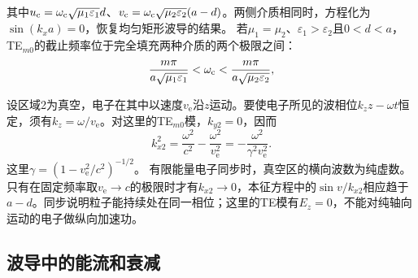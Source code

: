其中$u_\mathrm c = \omega_\mathrm c\sqrt{\mu_1\varepsilon_1}d$、$v_\mathrm c = \omega_\mathrm c\sqrt{\mu_2\varepsilon_2}(a - d)$。两侧介质相同时，方程化为$\sin(k_xa) = 0$，恢复均匀矩形波导的结果。
若$\mu_1 = \mu_2$、$\varepsilon_1 > \varepsilon_2$且$0 < d < a$，TE$_{m0}$的截止频率位于完全填充两种介质的两个极限之间：
\begin{equation}
    \label{eq:ed-dielectric-guide-cutoff-bounds}
    \frac{m\pi}{a\sqrt{\mu_1\varepsilon_1}} < \omega_\mathrm c < \frac{m\pi}{a\sqrt{\mu_2\varepsilon_2}},
\end{equation}

设区域2为真空，电子在其中以速度$v_{\mathrm e}$沿$z$运动。要使电子所见的波相位$k_z z - \omega t$恒定，须有$k_z = \omega/v_{\mathrm e}$。对这里的TE$_{m0}$模，$k_{y2} = 0$，因而
\[
    k_{x2}^2 = \frac{\omega^2}{c^2} - \frac{\omega^2}{v_{\mathrm e}^2}
       = -\frac{\omega^2}{\gamma^2v_{\mathrm e}^2}.
\]
这里$\gamma = (1 - v_{\mathrm e}^2/c^2)^{-1/2}$。
有限能量电子同步时，真空区的横向波数为纯虚数。只有在固定频率取$v_{\mathrm e} \to c$的极限时才有$k_{x2} \to 0$，本征方程中的$\sin v/k_{x2}$相应趋于$a - d$。同步说明粒子能持续处在同一相位；这里的TE模有$E_z = 0$，不能对纯轴向运动的电子做纵向加速功。

\subsection{波导中的能流和衰减}

